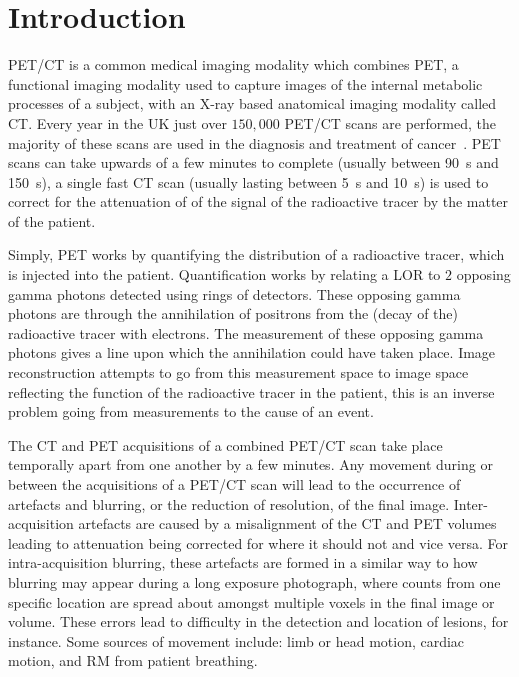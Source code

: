 \chapter{Introduction} \label{sec:introduction}
    
    
        \gls{PET}/\gls{CT} is a common medical imaging modality which combines \gls{PET}, a functional imaging modality used to capture images of the internal metabolic processes of a subject, with an X-ray based anatomical imaging modality called \gls{CT}. Every year in the UK just over $150,000$ \gls{PET}/\gls{CT} scans are performed, the majority of these scans are used in the diagnosis and treatment of cancer~. \gls{PET} scans can take upwards of a few minutes to complete (usually between \SI{90}{\second} and \SI{150}{\second}), a single fast \gls{CT} scan (usually lasting between \SI{5}{\second} and \SI{10}{\second}) is used to correct for the attenuation of of the signal of the radioactive tracer by the matter of the patient.
        
        Simply, \gls{PET} works by quantifying the distribution of a radioactive tracer, which is injected into the patient. Quantification works by relating a \gls{LOR} to $2$ opposing gamma photons detected using rings of detectors. These opposing gamma photons are through the annihilation of positrons from the (decay of the) radioactive tracer with electrons. The measurement of these opposing gamma photons gives a line upon which the annihilation could have taken place. Image reconstruction attempts to go from this measurement space to image space reflecting the function of the radioactive tracer in the patient, this is an inverse problem going from measurements to the cause of an event.
        
        The \gls{CT} and \gls{PET} acquisitions of a combined \gls{PET}/\gls{CT} scan take place temporally apart from one another by a few minutes. Any movement during or between the acquisitions of a \gls{PET}/\gls{CT} scan will lead to the occurrence of artefacts and blurring, or the reduction of resolution, of the final image. Inter-acquisition artefacts are caused by a misalignment of the \gls{CT} and \gls{PET} volumes leading to attenuation being corrected for where it should not and vice versa. For intra-acquisition blurring, these artefacts are formed in a similar way to how blurring may appear during a long exposure photograph, where counts from one specific location are spread about amongst multiple voxels in the final image or volume. These errors lead to difficulty in the detection and location of lesions, for instance. Some sources of movement include: limb or head motion, cardiac motion, and \gls{RM} from patient breathing.
        
